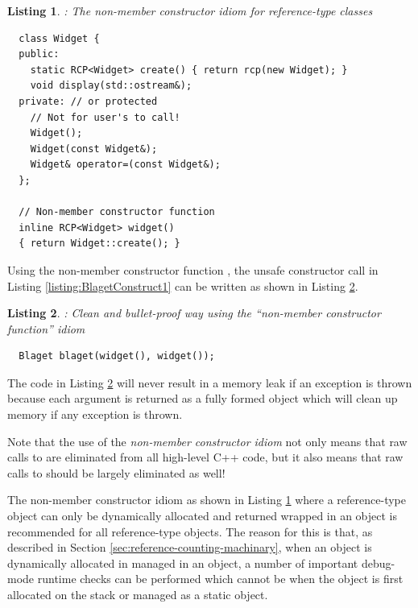 \documentclass[pdf,ps2pdf,11pt]{SANDreport}
\newtheorem{listing}{Listing}
\begin{document}
{}\begin{listing}: The non-member constructor idiom for reference-type
classes
\label{listing:WidgetNonmemberConstructor}
{\small\begin{verbatim}
  class Widget {
  public:
    static RCP<Widget> create() { return rcp(new Widget); }
    void display(std::ostream&);
  private: // or protected
    // Not for user's to call!
    Widget();
    Widget(const Widget&);
    Widget& operator=(const Widget&);
  };

  // Non-member constructor function
  inline RCP<Widget> widget()
  { return Widget::create(); }
\end{verbatim}}
\end{listing}

Using the non-member constructor function {}, the unsafe
constructor call in Listing {}\ref{listing:BlagetConstruct1} can be
written as shown in Listing {}\ref{listing:BlagetConstruct3}.

{}\begin{listing}: Clean and bullet-proof way using the ``non-member
constructor function'' idiom
\label{listing:BlagetConstruct3}
{\small\begin{verbatim}
  Blaget blaget(widget(), widget());
\end{verbatim}}
\end{listing}

The code in Listing {}\ref{listing:BlagetConstruct3} will never result
in a memory leak if an exception is thrown because each argument is
returned as a fully formed {} object which will clean up
memory if any exception is thrown.

Note that the use of the {}\textit{non-member constructor idiom} not
only means that raw calls to {} are eliminated from all
high-level C++ code, but it also means that raw calls to
{} should be largely eliminated as well!

The non-member constructor idiom as shown in Listing
{}\ref{listing:WidgetNonmemberConstructor} where a reference-type
object can only be dynamically allocated and returned wrapped in an
{} object is recommended for all reference-type objects.
The reason for this is that, as described in Section
{}\ref{sec:reference-counting-machinary}, when an object is
dynamically allocated in managed in an {} object, a number
of important debug-mode runtime checks can be performed which cannot
be when the object is first allocated on the stack or managed as a
static object.
\end{document}
